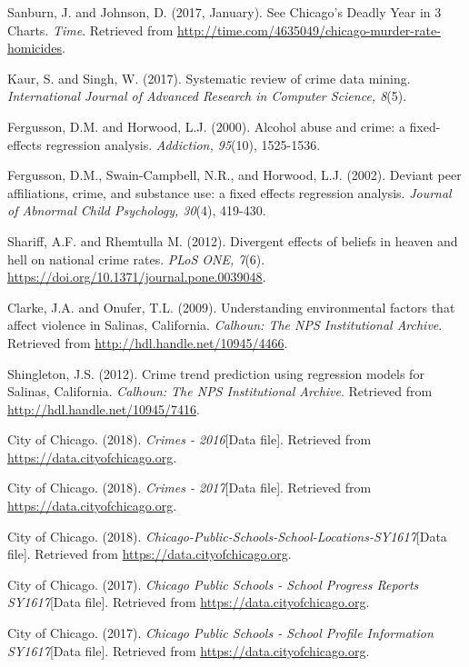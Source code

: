 \documentclass[12pt]{article}
\begin{document}
	\newpage
	\begin{thebibliography}{12}
	
Sanburn, J. and Johnson, D. (2017, January). See Chicago's Deadly Year in 3 Charts. \textit{Time}. Retrieved from \href{http://time.com/4635049/chicago-murder-rate-homicides}{http://time.com/4635049/chicago-murder-rate-homicides}.

Kaur, S. and Singh, W. (2017). Systematic review of crime data mining. \textit{International Journal of Advanced Research in Computer Science, 8}(5).

Fergusson, D.M. and Horwood, L.J. (2000). Alcohol abuse and crime: a fixed-effects regression analysis. \textit{Addiction, 95}(10), 1525-1536.

Fergusson, D.M., Swain-Campbell, N.R., and Horwood, L.J. (2002). Deviant peer affiliations, crime, and substance use: a fixed effects regression analysis. \textit{Journal of Abnormal Child Psychology, 30}(4), 419-430.

Shariff, A.F. and Rhemtulla M. (2012). Divergent effects of beliefs in heaven and hell on national crime rates. \textit{PLoS ONE, 7}(6). \href{https://doi.org/10.1371/journal.pone.0039048}{https://doi.org/10.1371/journal.pone.0039048}.

Clarke, J.A. and Onufer, T.L. (2009). Understanding environmental factors that affect violence in Salinas, California. \textit{Calhoun: The NPS Institutional Archive}. Retrieved from \href{http://hdl.handle.net/10945/4466}{http://hdl.handle.net/10945/4466}.

Shingleton, J.S. (2012). Crime trend prediction using regression models for Salinas, California. \textit{Calhoun: The NPS Institutional Archive}. Retrieved from \href{http://hdl.handle.net/10945/7416}{http://hdl.handle.net/10945/7416}.

City of Chicago. (2018). \textit{Crimes - 2016}[Data file]. Retrieved from \href{https://data.cityofchicago.org}{https://data.cityofchicago.org}.

City of Chicago. (2018). \textit{Crimes - 2017}[Data file]. Retrieved from \href{https://data.cityofchicago.org}{https://data.cityofchicago.org}.

City of Chicago. (2018). \textit{Chicago-Public-Schools-School-Locations-SY1617}[Data file]. Retrieved from \href{https://data.cityofchicago.org}{https://data.cityofchicago.org}.

City of Chicago. (2017). \textit{Chicago Public Schools - School Progress Reports SY1617}[Data file]. Retrieved from \href{https://data.cityofchicago.org}{https://data.cityofchicago.org}.

City of Chicago. (2017). \textit{Chicago Public Schools - School Profile Information SY1617}[Data file]. Retrieved from \href{https://data.cityofchicago.org}{https://data.cityofchicago.org}.

	\end{thebibliography}
\end{document}
